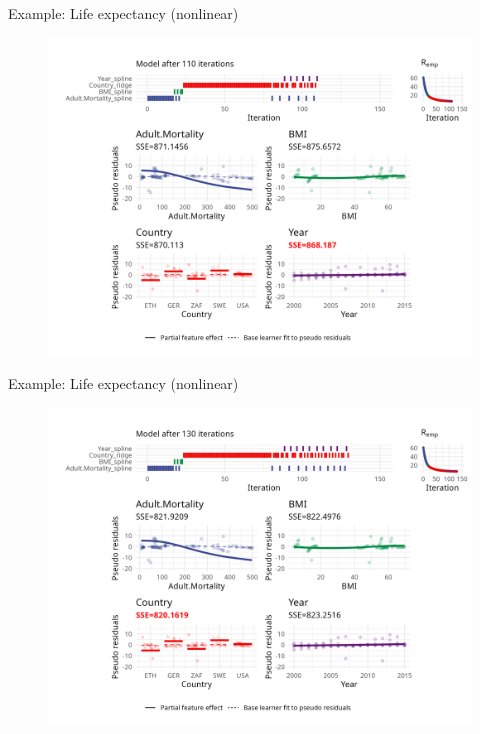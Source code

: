 \begin{frame}{Example: Life expectancy (nonlinear)}
	\begin{figure}
		\centering
		\includegraphics[width=\textwidth]{figures/cwb-anim/fig-iter-0110.png}
	\end{figure}
	\addtocounter{framenumber}{-1}
\end{frame}


\begin{frame}{Example: Life expectancy (nonlinear)}
	\begin{figure}
		\centering
		\includegraphics[width=\textwidth]{figures/cwb-anim/fig-iter-0130.png}
	\end{figure}
	\addtocounter{framenumber}{-1}
\end{frame}


